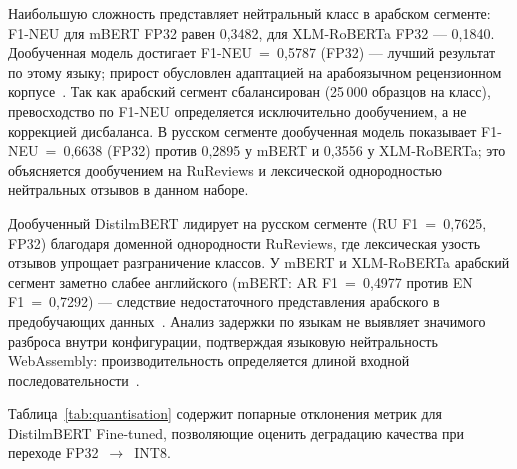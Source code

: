 Наибольшую сложность представляет нейтральный класс в арабском сегменте: F1-NEU для mBERT FP32 равен 0{,}3482, для XLM-RoBERTa FP32 — 0{,}1840. Дообученная модель достигает F1-NEU~=~0{,}5787 (FP32) — лучший результат по этому языку; прирост обусловлен адаптацией на арабоязычном рецензионном корпусе~\cite{wolf2020transformers}. Так как арабский сегмент сбалансирован (25\,000 образцов на класс), превосходство по F1-NEU определяется исключительно дообучением, а не коррекцией дисбаланса. В русском сегменте дообученная модель показывает F1-NEU~=~0{,}6638 (FP32) против 0{,}2895 у mBERT и 0{,}3556 у XLM-RoBERTa; это объясняется дообучением на RuReviews и лексической однородностью нейтральных отзывов в данном наборе.

Дообученный DistilmBERT лидирует на русском сегменте (RU F1~=~0{,}7625, FP32) благодаря доменной однородности RuReviews, где лексическая узость отзывов упрощает разграничение классов. У mBERT и XLM-RoBERTa арабский сегмент заметно слабее английского (mBERT: AR F1~=~0{,}4977 против EN F1~=~0{,}7292) — следствие недостаточного представления арабского в предобучающих данных~\cite{li2024multilingual, krasitskii2025sentiment}. Анализ задержки по языкам не выявляет значимого разброса внутри конфигурации, подтверждая языковую нейтральность WebAssembly: производительность определяется длиной входной последовательности~\cite{zhang2024wasm}.

Таблица~\ref{tab:quantisation} содержит попарные отклонения метрик для DistilmBERT Fine-tuned, позволяющие оценить деградацию качества при переходе FP32~$\rightarrow$~INT8.

\begin{table}[ht]
\centering
\caption{Влияние квантования на точность и задержку DistilmBERT FT}
\label{tab:quantisation}
\end{table}

